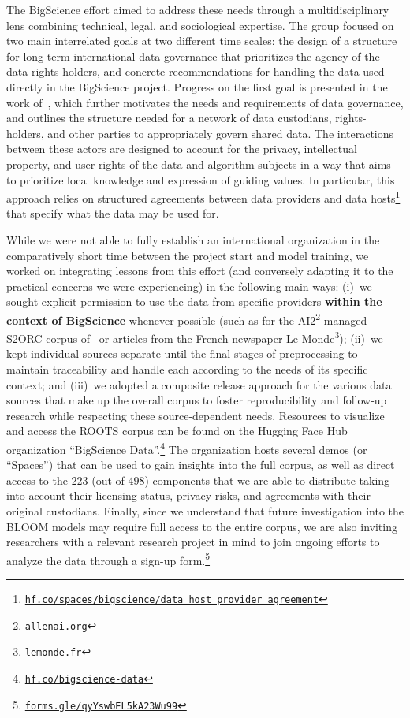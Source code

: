 \documentclass[twoside,11pt]{article}
\begin{document}
The BigScience effort aimed to address these needs through a multidisciplinary lens combining technical, legal, and sociological expertise.
The group focused on two main interrelated goals at two different time scales: the design of a structure for long-term international data governance that prioritizes the agency of the data rights-holders, and concrete recommendations for handling the data used directly in the BigScience project.
Progress on the first goal is presented in the work of~\citet{jernite2022data}, which further motivates the needs and requirements of data governance, and outlines the structure needed for a network of data custodians, rights-holders, and other parties to appropriately govern shared data.
The interactions between these actors are designed to account for the privacy, intellectual property, and user rights of the data and algorithm subjects in a way that aims to prioritize local knowledge and expression of guiding values.
In particular, this approach relies on structured agreements between data providers and data hosts\footnote{\href{https://hf.co/spaces/bigscience/data_host_provider_agreement}{\texttt{hf.co/spaces/bigscience/data\_host\_provider\_agreement}}} that specify what the data may be used for.

While we were not able to fully establish an international organization in the comparatively short time between the project start and model training, we worked on integrating lessons from this effort (and conversely adapting it to the practical concerns we were experiencing) in the following main ways: (i)~we sought explicit permission to use the data from specific providers \textbf{within the context of BigScience} whenever possible (such as for the AI2\footnote{\href{https://allenai.org/}{\texttt{allenai.org}}}-managed S2ORC corpus of~\citet{lo2020s2orc} or articles from the French newspaper Le Monde\footnote{\href{https://www.lemonde.fr/}{\texttt{lemonde.fr}}}); (ii)~we kept individual sources separate until the final stages of preprocessing to maintain traceability and handle each according to the needs of its specific context; and (iii)~we adopted a composite release approach for the various data sources that make up the overall corpus to foster reproducibility and follow-up research while respecting these source-dependent needs.
Resources to visualize and access the ROOTS corpus can be found on the Hugging Face Hub organization ``BigScience Data''.\footnote{\href{https://hf.co/bigscience-data}{\texttt{hf.co/bigscience-data}}} The organization hosts several demos (or ``Spaces'') that can be used to gain insights into the full corpus, as well as direct access to the 223 (out of 498) components that we are able to distribute taking into account their licensing status, privacy risks, and agreements with their original custodians. Finally, since we understand that future investigation into the BLOOM models may require full access to the entire corpus, we are also inviting researchers with a relevant research project in mind to join ongoing efforts to analyze the data through a sign-up form.\footnote{\href{https://forms.gle/qyYswbEL5kA23Wu99}{{\texttt{forms.gle/qyYswbEL5kA23Wu99}}}}
\end{document}
